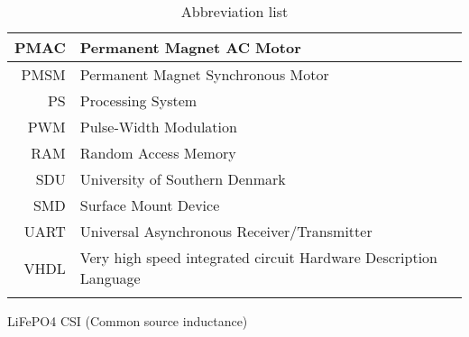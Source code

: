 \begin{table}[H]
\begin{tabular}{|r|l|}
PMAC         & Permanent Magnet AC Motor                                        \\ \hline
PMSM         & Permanent Magnet Synchronous Motor                               \\ \hline
PS           & Processing System                                                \\ \hline
PWM          & Pulse-Width Modulation                                           \\ \hline
RAM          & Random Access Memory                                             \\ \hline
SDU          & University of Southern Denmark                                   \\ \hline
SMD          & Surface Mount Device                                             \\ \hline
UART         & Universal Asynchronous Receiver/Transmitter                      \\ \hline
VHDL         & Very high speed integrated circuit Hardware Description Language \\ \hline
             &                                                                  \\ \hline
\end{tabular}
\caption{Abbreviation list}\label{Abbreviationlist}
\label{tab:variable_ids}
\end{table}


LiFePO4
CSI (Common source inductance)
